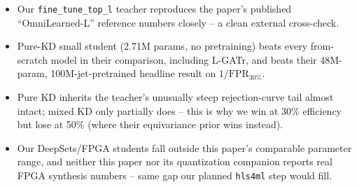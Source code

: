\begin{itemize}
    \item Our \texttt{fine\_tune\_top\_l} teacher reproduces the paper's
    published ``OmniLearned-L'' reference numbers closely -- a clean
    external cross-check.
    \item Pure-KD small student (2.71M params, no pretraining) beats every
    from-scratch model in their comparison, including L-GATr, and beats
    their 48M-param, 100M-jet-pretrained headline result on
    $1/\mathrm{FPR}_{30\%}$.
    \item Pure KD inherits the teacher's unusually steep rejection-curve
    tail almost intact; mixed KD only partially does -- this is why we win
    at 30\% efficiency but lose at 50\% (where their equivariance prior
    wins instead).
    \item Our DeepSets/FPGA students fall outside this paper's comparable
    parameter range, and neither this paper nor its quantization companion
    reports real FPGA synthesis numbers -- same gap our planned
    \texttt{hls4ml} step would fill.
\end{itemize}
